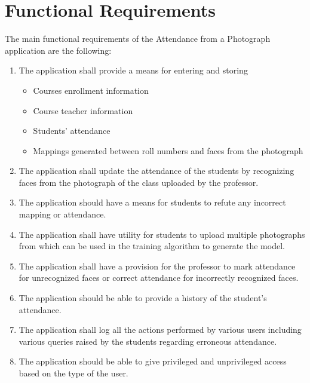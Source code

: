\documentclass[paper=a4, fontsize=15pt]{scrartcl}
\begin{document}
\section{Functional Requirements}
\begin{multicols}{2}

The main functional requirements of the Attendance from a Photograph application are the following:

\begin{enumerate}
    \item The application shall provide a means for entering and storing
    \begin{itemize}
        \item Courses enrollment information
        \item Course teacher information
        \item Students' attendance
        \item Mappings generated between roll numbers and faces from the photograph
    \end{itemize}
    
    \item The application shall update the attendance of the students by recognizing faces from the photograph of the class uploaded by the professor.
    
    \item The application should have a means for students to refute any incorrect mapping or attendance.
    
    \item The application shall have utility for students to upload multiple photographs from which can be used in the training algorithm to generate the model.
    
    \item The application shall have a provision for the professor to mark attendance for 
unrecognized faces or correct attendance for incorrectly recognized faces.

    \item The application should be able to provide a history of the student's attendance.
    
    \item The application shall log all the actions performed by various users including various queries raised by the students regarding erroneous attendance.
    
    \item The application should be able to give privileged and unprivileged access based on the	type of the user.
    

\end{enumerate}
\end{multicols}
\end{document}
